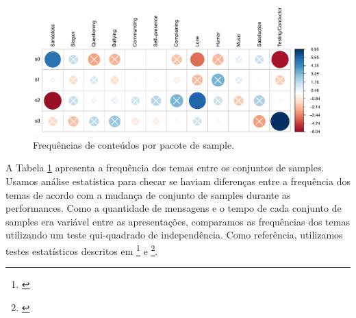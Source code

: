 

\begin{figure}

\includegraphics[width=1.1\linewidth]{pictures/cap3/p_values}
\caption{Frequências de conteúdos por pacote de sample.}
\label{subj_themes}
\end{figure}

A Tabela \ref{subj_themes} apresenta a frequência dos temas entre os conjuntos de samples. Usamos análise estatística para checar se haviam diferenças entre a frequência dos temas de acordo com a mudança de conjunto de samples durante as performances. Como a quantidade de mensagens e o tempo de cada conjunto de samples era variável entre as apresentações, comparamos as frequências dos temas utilizando um teste qui-quadrado de independência. Como referência, utilizamos testes estatísticos descritos em \footnote{\cite{beasley1995multiple}} e \footnote{\cite{garcia2003cellwise}}. 


